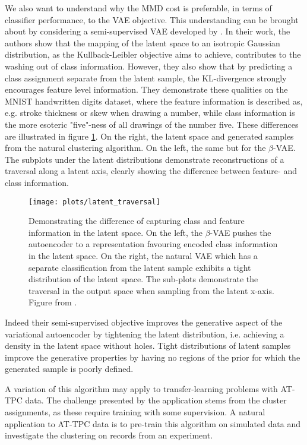 We also want to understand why the MMD cost is preferable, in terms of classifier performance, to the VAE objective. This understanding can be brought about by considering a semi-supervised VAE developed by \citet{Antoran2019}. In their work, the authors show that the mapping of the latent space to an isotropic Gaussian distribution, as the Kullback-Leibler objective aims to achieve, contributes to the washing out of class information. However, they also show that by predicting a class assignment separate from the latent sample, the KL-divergence strongly encourages feature level information. They demonstrate these qualities on the MNIST handwritten digits dataset, where the feature information is described as, e.g. stroke thickness or skew when drawing a number, while class information is the more esoteric "five"-ness of all drawings of the number five. These differences are illustrated in figure \ref{fig:latent_traversal}. On the right, the latent space and generated samples from the natural clustering algorithm. On the left, the same but for the $\beta$-VAE. The subplots under the latent distributions demonstrate reconstructions of a traversal along a latent axis, clearly showing the difference between feature- and class information. 



\begin{figure}
\centering
\texttt{[image: plots/latent\_traversal]}
\caption[Difference between generative and discriminative latent spaces]{Demonstrating the difference of capturing class and feature information in the latent space. On the left, the $\beta$-VAE pushes the autoencoder to a representation favouring encoded class information in the latent space. On the right, the natural VAE which has a separate classification from the latent sample exhibits a tight distribution of the latent space. The sub-plots demonstrate the traversal in the output space when sampling from the latent x-axis. Figure from \citet{Antoran2019}.}\label{fig:latent_traversal}
\end{figure}

Indeed their semi-supervised objective improves the generative aspect of the variational autoencoder by tightening the latent distribution, i.e. achieving a density in the latent space without holes. Tight distributions of latent samples improve the generative properties by having no regions of the prior for which the generated sample is poorly defined. 

A variation of this algorithm may apply to transfer-learning problems with AT-TPC data. The challenge presented by the application stems from the cluster assignments, as these require training with some supervision. A natural application to AT-TPC data is to pre-train this algorithm on simulated data and investigate the clustering on records from an experiment. 

